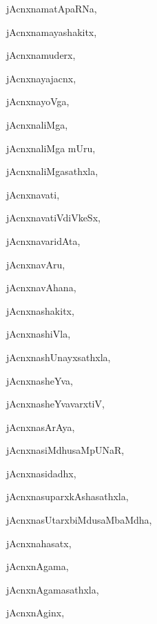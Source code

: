 \begin{multicols}{3}
{\noindent
{jAcnxnamatApaRNa}, \pageref{jAcnxnamatApaRNa}

\noindent
{jAcnxnamayashakitx}, \pageref{jAcnxnamayashakitx}

\noindent
{jAcnxnamuderx}, \pageref{jAcnxnamuderx}

\noindent
{jAcnxnayajacnx}, \pageref{jAcnxnayajacnx}

\noindent
{jAcnxnayoVga}, \pageref{jAcnxnayoVga}

\noindent
{jAcnxnaliMga}, \pageref{jAcnxnaliMga}

\noindent
{jAcnxnaliMga mUru}, \pageref{jAcnxnaliMga mUru}

\noindent
{jAcnxnaliMgasathxla}, \pageref{jAcnxnaliMgasathxla}

\noindent
{jAcnxnavati}, \pageref{jAcnxnavati}

\noindent
{jAcnxnavatiVdiVkeSx}, \pageref{jAcnxnavatiVdiVkeSx}

\noindent
{jAcnxnavaridAta}, \pageref{jAcnxnavaridAta}

\noindent
{jAcnxnavAru}, \pageref{jAcnxnavAru}

\noindent
{jAcnxnavAhana}, \pageref{jAcnxnavAhana}

\noindent
{jAcnxnashakitx}, \pageref{jAcnxnashakitx}

\noindent
{jAcnxnashiVla}, \pageref{jAcnxnashiVla}

\noindent
{jAcnxnashUnayxsathxla}, \pageref{jAcnxnashUnayxsathxla}

\noindent
{jAcnxnasheYva}, \pageref{jAcnxnasheYva}

\noindent
{jAcnxnasheYvavarxtiV}, \pageref{jAcnxnasheYvavarxtiV}

\noindent
{jAcnxnasArAya}, \pageref{jAcnxnasArAya}

\noindent
{jAcnxnasiMdhusaMpUNaR}, \pageref{jAcnxnasiMdhusaMpUNaR}

\noindent
{jAcnxnasidadhx}, \pageref{jAcnxnasidadhx}

\noindent
{jAcnxnasuparxkAshasathxla}, \pageref{jAcnxnasuparxkAshasathxla}

\noindent
{jAcnxnasUtarxbiMdusaMbaMdha}, \pageref{jAcnxnasUtarxbiMdusaMbaMdha}

\noindent
{jAcnxnahasatx}, \pageref{jAcnxnahasatx}

\noindent
{jAcnxnAgama}, \pageref{jAcnxnAgama}

\noindent
{jAcnxnAgamasathxla}, \pageref{jAcnxnAgamasathxla}

\noindent
{jAcnxnAginx}, \pageref{jAcnxnAginx}

}
\end{multicols}
